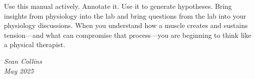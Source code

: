 Use this manual actively. Annotate it. Use it to generate hypotheses. Bring insights from physiology into the lab and bring questions from the lab into your physiology discussions. When you understand how a muscle creates and sustains tension—and what can compromise that process—you are beginning to think like a physical therapist.

\vspace{2em}
\noindent\textit{Sean Collins}\\
\textit{May 2025}
